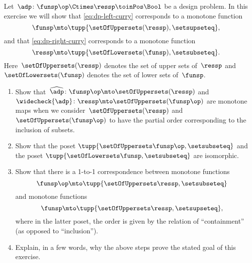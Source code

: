 \begin{gradedexercise}
    \label{ex:CurryingDesignProblems}
    Let~$\adp\colon \funsp\op \Ctimes \ressp\toinPos \Bool$ be a design problem.
    In this exercise we will show that \cref{eq:dp-left-curry} corresponds to a monotone function
    \begin{equation}
        \funsp \mto \tupp{\setOfUppersets (\ressp), \setsupseteq},
    \end{equation}
    and that \cref{eq:dp-right-curry} corresponds to a monotone function
    \begin{equation}
        \ressp \mto \tupp{\setOfLowersets(\funsp), \setsubseteq}.
    \end{equation}
    Here~$\setOfUppersets (\ressp)$ denotes the set of upper sets of~$\ressp$ and~$\setOfLowersets(\funsp)$ denotes the set of lower sets of~$\funsp$.

    \begin{enumerate}
        \item Show that~$\widehat{\adp} \colon \funsp\op \mto \setOfUppersets (\ressp)$ and~$\widecheck{\adp} \colon \ressp \mto \setOfUppersets (\funsp\op)$ are monotone maps when we consider~$\setOfUppersets (\ressp)$ and~$\setOfUppersets (\funsp\op)$ to have the partial order corresponding to the inclusion of subsets.
        \item Show that the poset $\tupp{\setOfUppersets\funsp\op, \setsubseteq}$ and the poset $\tupp{\setOfLowersets\funsp, \setsubseteq}$ are isomorphic.
        \item Show that there is a 1-to-1 correspondence between monotone functions
              \begin{equation}
                  \funsp\op \mto \tupp{\setOfUppersets \ressp, \setsubseteq}
              \end{equation}
              and monotone functions
              \begin{equation}
                  \funsp \mto \tupp{\setOfUppersets \ressp, \setsupseteq},
              \end{equation}
              where in the latter poset, the order is given by the relation of ``containment'' (as opposed to ``inclusion'').
        \item Explain, in a few words, why the above steps prove the stated goal of this exercise.
    \end{enumerate}
\end{gradedexercise}

